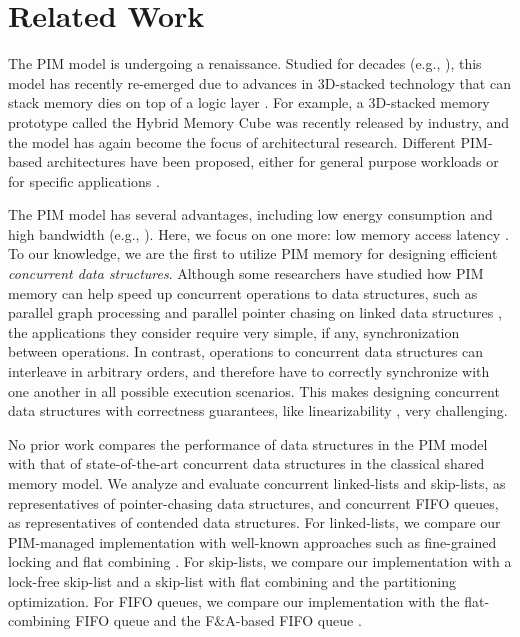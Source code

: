 \section{Related Work}
\label{section:related_work}
The PIM model is undergoing a renaissance.  Studied for decades (e.g.,
\cite{Stone1970, Kogge1994, Gokhale1995, Patterson1997, Oskin1998,
  KangHYKGLTP99, Hall1999, Elliott:1992}), this model has recently
re-emerged due to advances in 3D-stacked technology that can stack
memory dies on top of a logic layer \cite{jeddeloh2012, Loh2008,
  Black2006, Kim2014HotChip, Lee:2016:SMA:2836331.2832911}.  For
example, a 3D-stacked memory prototype called the Hybrid Memory Cube
\cite{website:HMC} was recently released by industry, and the model
has again become the focus of architectural research.  Different
PIM-based architectures have been proposed, either for general purpose
workloads or for specific applications \cite{Ahn2015:1, Ahn2015:2,
  Zhang2014:TTP, hsieh2016accelerating, Azarkhish16, Akin2015:DRM,
  Azarkhish2015, AzarkhishPRLB17, boroumand2016, ZhuASSHPF13,
  ZhuGSPF13, Seshadri:2015, Hashemi:2016, Hashemi:2016b,
  Hsieh:2016:TOM, Seshadri:2013, DBLP:journals/corr/SeshadriLMHBKKM16,
  DBLP:conf/hpca/ChangNLGQM16, DBLP:journals/corr/SeshadriM16}.

The PIM model has several advantages, including low energy consumption and high bandwidth 
(e.g., \cite{Ahn2015:2, Zhang2014:TTP, ZhuASSHPF13, AzarkhishPRLB17}). 
Here, we focus on one more: low memory access latency 
\cite{Loh2008, hsieh2016accelerating, Azarkhish16, Hashemi:2016}.
To our knowledge, we are the first to utilize PIM memory for designing efficient \emph{concurrent data structures}. 
Although some researchers have studied how PIM memory can help speed up concurrent 
operations to data structures, such as parallel graph processing \cite{Ahn2015:2} and  
parallel pointer chasing on linked data structures \cite{hsieh2016accelerating}, 
the applications they consider require very simple, if any, synchronization between operations. 
In contrast, operations to concurrent data structures can interleave in arbitrary orders, 
and therefore have to correctly synchronize with one another in all possible execution scenarios. 
This makes designing concurrent data structures with correctness guarantees, like 
linearizability \cite{Herlihy90}, very challenging. 

No prior work compares the performance of data structures in the PIM model 
with that of state-of-the-art concurrent data structures in the classical shared memory model. 
We analyze and evaluate concurrent linked-lists and skip-lists, 
as representatives of pointer-chasing data structures, and concurrent FIFO queues, 
as representatives of contended data structures.
For linked-lists, we compare our PIM-managed implementation with well-known approaches 
such as fine-grained locking \cite{Heller05} and flat combining 
\cite{Hendler10, Fatourou12, Hendler:2010:DISC}.
For skip-lists, we compare our implementation with a lock-free skip-list \cite{Herlihy08} 
and a skip-list with flat combining and the partitioning optimization. 
For FIFO queues, we compare our implementation with the flat-combining FIFO queue 
\cite{Hendler10} and the F\&A-based FIFO queue \cite{Morrison13}. 
